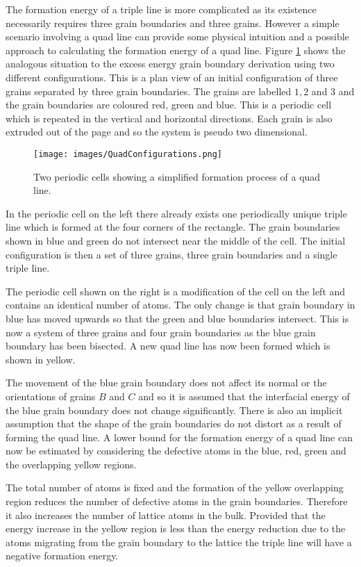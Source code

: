 \documentclass[12pt,a4paper,openany]{report}
\begin{document}
The formation energy of a triple line is more complicated as its existence necessarily requires three grain boundaries and three grains. However a simple scenario involving a quad line can provide some physical intuition and a possible approach to calculating the formation energy of a quad line. Figure \ref{fig:Quad} shows the analogous situation to the excess energy grain boundary derivation using two different configurations. This is a plan view of an initial configuration of three grains separated by three grain boundaries. The grains are labelled $1, 2$ and $3$ and the grain boundaries are coloured red, green and blue. This is a periodic cell which is repeated in the vertical and horizontal directions. Each grain is also extruded out of the page and so the system is pseudo two dimensional.
\newpage
\begin{figure}[H]
	\centering
	\texttt{[image: images/QuadConfigurations.png]} 
\label{fig:Quad}
\caption{Two periodic cells showing a simplified formation process of a quad line.}
\end{figure}
 
In the periodic cell on the left there already exists one periodically unique triple line which is formed at the four corners of the rectangle. The grain boundaries shown in blue and green do not intersect near the middle of the cell. The initial configuration is then a set of three grains, three grain boundaries and a single triple line.

The periodic cell shown on the right is a modification of the cell on the left and contains an identical number of atoms. The only change is that grain boundary in blue has moved upwards so that the green and blue boundaries intersect. This is now a system of three grains and four grain boundaries as the blue grain boundary has been bisected. A new quad line has now been formed which is shown in yellow.

The movement of the blue grain boundary does not affect its normal  or the orientations of grains $B$ and $C$ and so it is assumed that the interfacial energy of the blue grain boundary does not change significantly. There is also an implicit assumption that the shape of the grain boundaries do not distort as a result of forming the quad line. A lower bound for the formation energy of a quad line can now be estimated by considering the defective atoms in the blue, red, green and the overlapping yellow regions.

The total number of atoms is fixed and the formation of the yellow overlapping region reduces the number of defective atoms in the grain boundaries. Therefore it also increases the number of lattice atoms in the bulk. Provided that the energy increase in the yellow region is less than the energy reduction due to the atoms migrating from the grain boundary to the lattice the triple line will have a negative formation energy. 
 
\end{document}
